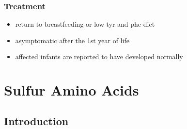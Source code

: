 \documentclass{scrartcl}
\begin{document}
\subsubsection{Treatment}
\label{sec:org2c4c2d0}
\begin{itemize}
\item return to breastfeeding or low tyr and phe diet
\item asymptomatic after the 1st year of life
\item affected infants are reported to have developed normally
\end{itemize}

\section{Sulfur Amino Acids}
\label{sec:orgc9f641e}
\subsection{Introduction}
\label{sec:org6f8e0c0}
\end{document}
